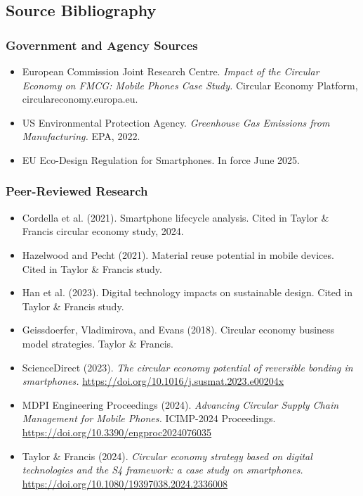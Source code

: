 \documentclass[11pt,letterpaper]{article}
\begin{document}
\subsection{Source Bibliography}

\subsubsection{Government and Agency Sources}
\begin{itemize}[noitemsep]
  \item European Commission Joint Research Centre. \textit{Impact of the Circular Economy on FMCG: Mobile Phones Case Study.} Circular Economy Platform, circulareconomy.europa.eu.
  \item US Environmental Protection Agency. \textit{Greenhouse Gas Emissions from Manufacturing.} EPA, 2022.
  \item EU Eco-Design Regulation for Smartphones. In force June 2025.
\end{itemize}

\subsubsection{Peer-Reviewed Research}
\begin{itemize}[noitemsep]
  \item Cordella et al. (2021). Smartphone lifecycle analysis. Cited in Taylor \& Francis circular economy study, 2024.
  \item Hazelwood and Pecht (2021). Material reuse potential in mobile devices. Cited in Taylor \& Francis study.
  \item Han et al. (2023). Digital technology impacts on sustainable design. Cited in Taylor \& Francis study.
  \item Geissdoerfer, Vladimirova, and Evans (2018). Circular economy business model strategies. Taylor \& Francis.
  \item ScienceDirect (2023). \textit{The circular economy potential of reversible bonding in smartphones.} \url{https://doi.org/10.1016/j.susmat.2023.e00204x}
  \item MDPI Engineering Proceedings (2024). \textit{Advancing Circular Supply Chain Management for Mobile Phones.} ICIMP-2024 Proceedings. \url{https://doi.org/10.3390/engproc2024076035}
  \item Taylor \& Francis (2024). \textit{Circular economy strategy based on digital technologies and the S4 framework: a case study on smartphones.} \url{https://doi.org/10.1080/19397038.2024.2336008}
\end{itemize}
\end{document}
